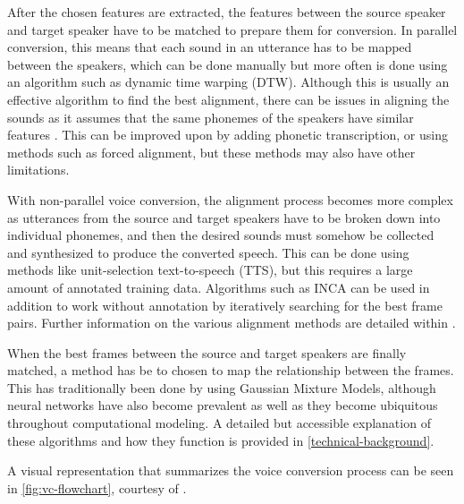 \documentclass
[
    a4paper,
    twoside,
    12pt,
]
{report}
\begin{document}
After the chosen features are extracted, the features between the source
speaker and target speaker have to be matched to prepare them for
conversion. In parallel conversion, this means that each sound in an
utterance has to be mapped between the speakers, which can be done
manually but more often is done using an algorithm such as dynamic time
warping (DTW). Although this is usually an effective algorithm to find
the best alignment, there can be issues in aligning the sounds as it
assumes that the same phonemes of the speakers have similar features
\parencite{mohammadi2017}. This can be improved upon by adding phonetic
transcription, or using methods such as forced alignment, but these
methods may also have other limitations.

With non-parallel voice conversion, the alignment process becomes more
complex as utterances from the source and target speakers have to be
broken down into individual phonemes, and then the desired sounds must
somehow be collected and synthesized to produce the converted speech.
This can be done using methods like unit-selection text-to-speech (TTS),
but this requires a large amount of annotated training data. Algorithms
such as INCA can be used in addition to work without annotation by
iteratively searching for the best frame pairs. Further information on
the various alignment methods are detailed within
\textcite{mohammadi2017}.

When the best frames between the source and target speakers are finally
matched, a method has be to chosen to map the relationship between the
frames. This has traditionally been done by using Gaussian Mixture
Models, although neural networks have also become prevalent as well as
they become ubiquitous throughout computational modeling. A detailed but
accessible explanation of these algorithms and how they function is
provided in \autoref{technical-background}.

A visual representation that summarizes the voice conversion process can
be seen in \autoref{fig:vc-flowchart}, courtesy of
\textcite{mohammadi2017}.
\end{document}
